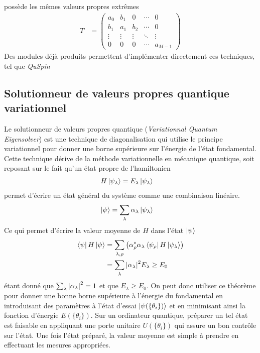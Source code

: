 \documentclass[../main.tex]{subfiles}
\begin{document}
    possède les mêmes valeurs propres extrêmes
    \begin{align}
        T&=\begin{pmatrix}
            a_0&b_1&0&\cdots&0\\
            b_1&a_1&b_2&\cdots&0\\
            \vdots&\vdots&\vdots&\ddots&\vdots\\
            0&0&0&\cdots&a_{M-1}
        \end{pmatrix}
    \end{align}
    Des modules déjà
    produits permettent d'implémenter directement ces techniques, tel que
    \textit{QuSpin}\cite{10.21468/SciPostPhys.7.2.020}


    \subsection{Solutionneur de valeurs propres quantique variationnel} %
    \label{sub:vqe}
    Le solutionneur de valeurs propres quantique (\textit{Variationnal Quantum
    Eigensolver}) est une technique de diagonalisation qui utilise le
    principe variationnel pour donner une borne supérieure sur l'énergie de
    l'état fondamental. Cette technique dérive de la méthode variationnelle en
    mécanique quantique, soit reposant sur le fait qu'un état propre de
    l'hamiltonien
    \begin{align}
        H\ket{\psi_\lambda}&=E_\lambda\ket{\psi_\lambda}
    \end{align}
    permet d'écrire un état général du système comme une combinaison linéaire.
    \begin{align}
        \ket{\psi}&=\sum_\lambda\alpha_\lambda\ket{\psi_\lambda}
    \end{align}
    Ce qui permet d'écrire la valeur moyenne de $H$ dans l'état $\ket{\psi}$
    \begin{align}
        \bra{\psi}H\ket{\psi}&=\sum_{\lambda,\rho}\qty(\alpha_\rho^*\alpha_\lambda
        \bra{\psi_\rho}H\ket{\psi_\lambda})\\
        &=\sum_\lambda\abs{\alpha_\lambda}^2E_\lambda\geq E_0
    \end{align}
    étant donné que $\sum_\lambda\abs{\alpha_\lambda}^2=1$ et que $E_\lambda\geq
    E_0$. On peut donc utiliser ce théorème pour donner une bonne borne supérieure
    à l'énergie du fondamental en introduisant des paramètres à l'état d'essai
    $\ket{\psi(\{\theta_i\})}$ et en minimisant ainsi la fonction d'énergie
    $E(\{\theta_i\})$. Sur un ordinateur quantique, préparer un tel état est
    faisable en appliquant une porte unitaire $U(\{\theta_i\})$ qui assure un
    bon contrôle sur l'état. Une fois l'état préparé, la valeur moyenne est
    simple à prendre en effectuant les mesures appropriées.

\end{document}
